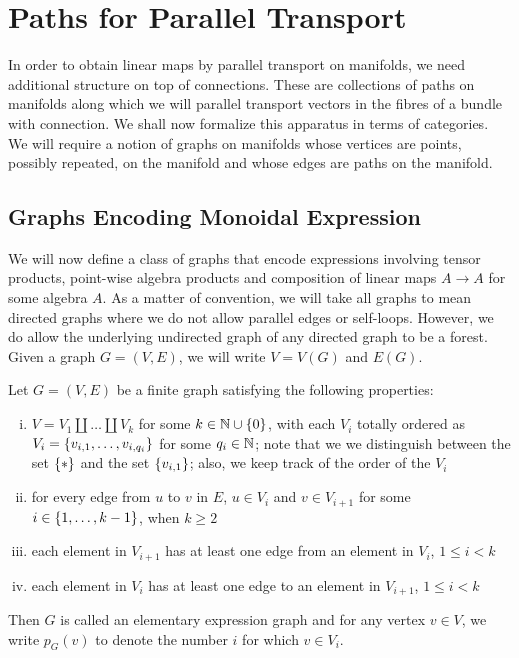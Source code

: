 \documentclass[./Thick_TQFTs_and_Quantum_Information.tex]{subfiles}
\begin{document}
\section{Paths for Parallel Transport}

In order to obtain linear maps by parallel transport on manifolds, we need
additional structure on top of connections. These are collections of paths on
manifolds along which we will parallel transport vectors in the fibres of a
bundle with connection. We shall now formalize this apparatus in terms of
categories. We will require a notion of graphs on manifolds whose vertices are
points, possibly repeated, on the manifold and whose edges are paths on the
manifold.

\subsection{Graphs Encoding Monoidal Expression}

We will now define a class of graphs that encode expressions involving tensor
products, point-wise algebra products and composition of linear maps $A \to A$
for some algebra $A$. As a matter of convention, we will take all graphs to mean
directed graphs where we do not allow parallel edges or self-loops. However, we
do allow the underlying undirected graph of any directed graph to be a forest.
Given a graph $G = (V, E)$, we will write $V = V(G)$ and $E(G)$.

\begin{defn}\label{eeg}
Let $G = (V, E)$ be a finite graph satisfying the following properties:
\begin{enumerate}[(i)]

\setlength{\itemsep}{0pt}

\item \label{eeg:part}
$V = V_1 \amalg \dots \amalg V_k$ for some $k \in \N \cup \set{0}$, with each
$V_i$ totally ordered as
$V_i = \set{v_{i, 1}, \dots, v_{i, q_i}}$ for some $q_i \in \mathbb{N}$; note that we
we distinguish between the set $\set{*}$ and the set $\set{v_{i, 1}}$; also, we
keep track of the order of the $V_i$

\item \label{eeg:forward}
for every edge from $u$ to $v$ in $E$, $u \in V_i$ and
$v \in V_{i + 1}$ for some $i \in \set{1, \dots, k - 1}$, when $k \geq 2$

\item \label{eeg:nonredright}
each element in $V_{i + 1}$ has at least one edge from an element in $V_{i}$,
$1 \leq i < k$

\item \label{eeg:nonredleft}
each element in $V_{i}$ has at least one edge to an element in $V_{i + 1}$,
$1 \leq i < k$

\end{enumerate}
Then $G$ is called an elementary expression graph and for any vertex $v \in V$,
we write $p_{G}(v)$ to denote the number $i$ for which $v \in V_i$.
\end{defn}
\end{document}
